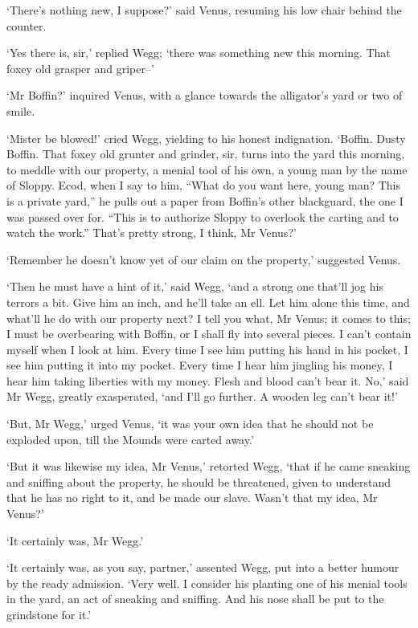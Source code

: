 ‘There’s nothing new, I suppose?’ said Venus, resuming his low chair
behind the counter.

‘Yes there is, sir,’ replied Wegg; ‘there was something new this
morning. That foxey old grasper and griper--’

‘Mr Boffin?’ inquired Venus, with a glance towards the alligator’s yard
or two of smile.

‘Mister be blowed!’ cried Wegg, yielding to his honest indignation.
‘Boffin. Dusty Boffin. That foxey old grunter and grinder, sir, turns
into the yard this morning, to meddle with our property, a menial tool
of his own, a young man by the name of Sloppy. Ecod, when I say to him,
“What do you want here, young man? This is a private yard,” he pulls out
a paper from Boffin’s other blackguard, the one I was passed over for.
“This is to authorize Sloppy to overlook the carting and to watch the
work.” That’s pretty strong, I think, Mr Venus?’

‘Remember he doesn’t know yet of our claim on the property,’ suggested
Venus.

‘Then he must have a hint of it,’ said Wegg, ‘and a strong one that’ll
jog his terrors a bit. Give him an inch, and he’ll take an ell. Let him
alone this time, and what’ll he do with our property next? I tell you
what, Mr Venus; it comes to this; I must be overbearing with Boffin, or
I shall fly into several pieces. I can’t contain myself when I look
at him. Every time I see him putting his hand in his pocket, I see him
putting it into my pocket. Every time I hear him jingling his money, I
hear him taking liberties with my money. Flesh and blood can’t bear it.
No,’ said Mr Wegg, greatly exasperated, ‘and I’ll go further. A wooden
leg can’t bear it!’

‘But, Mr Wegg,’ urged Venus, ‘it was your own idea that he should not be
exploded upon, till the Mounds were carted away.’

‘But it was likewise my idea, Mr Venus,’ retorted Wegg, ‘that if he came
sneaking and sniffing about the property, he should be threatened, given
to understand that he has no right to it, and be made our slave. Wasn’t
that my idea, Mr Venus?’

‘It certainly was, Mr Wegg.’

‘It certainly was, as you say, partner,’ assented Wegg, put into
a better humour by the ready admission. ‘Very well. I consider his
planting one of his menial tools in the yard, an act of sneaking and
sniffing. And his nose shall be put to the grindstone for it.’

